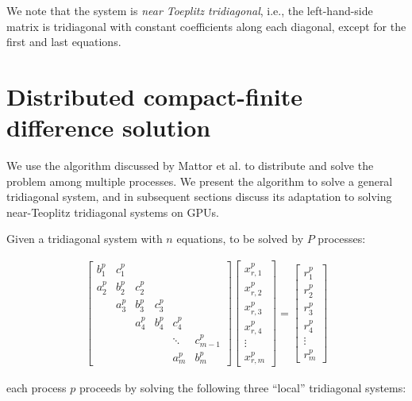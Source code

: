 \documentclass{elsarticle}
\begin{document}
We note that the system is \emph{near Toeplitz tridiagonal},
i.e., the left-hand-side matrix is tridiagonal with
constant coefficients along each diagonal,
except for the first and last equations.

\section{Distributed compact-finite difference solution} 

We use the algorithm discussed by Mattor et al.
\cite{mattor1995algorithm}
to distribute and solve the problem among multiple processes. 
We present the algorithm to solve a general tridiagonal system,
and in subsequent sections discuss its adaptation to solving
near-Teoplitz tridiagonal systems on GPUs.

Given a tridiagonal system with  $n$ equations,
to be solved by $P$ processes:

\begin{align}
& \begin{bmatrix}
b_1^p & c_1^p \\
a_2^p & b_2^p & c_2^p \\
      & a_3^p & b_3^p & c_3^p \\
      &       & a_4^p & b_4^p & c_4^p \\
      &       &       &       &  \ddots & c_{m-1}^p\\
      &       &       &       &     a_{m}^p  & b_{m}^p
\end{bmatrix}
\begin{bmatrix}
x_{r,1}^p \\
x_{r,2}^p \\
x_{r,3}^p \\
x_{r,4}^p \\
\vdots \\
x_{r,m}^p
\end{bmatrix}
=
\begin{bmatrix}
r_1^p \\
r_2^p \\
r_3^p \\
r_4^p \\
\vdots \\
r_m^p
\end{bmatrix} & \label{eqn:global-system} 
\end{align}

each process $p$ proceeds by solving the following three ``local''
tridiagonal systems:
\end{document}
